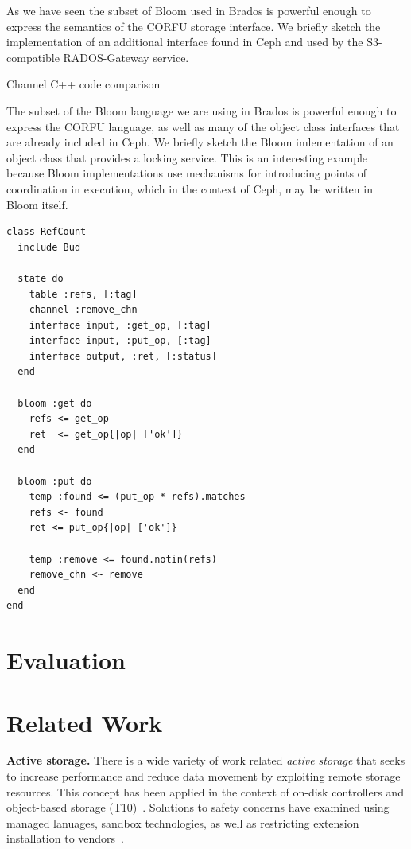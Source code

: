 \documentclass[10pt,twocolumn]{article}
\begin{document}
As we have seen the subset of Bloom used in Brados is powerful enough to
express the semantics of the CORFU storage interface. We briefly sketch the
implementation of an additional interface found in Ceph and used by the
S3-compatible RADOS-Gateway service.

Channel
C++ code comparison

The subset of the Bloom language we are using in Brados is powerful enough to
express the CORFU language, as well as many of the object class interfaces that
are already included in Ceph. We briefly sketch the Bloom imlementation of an
object class that provides a locking service. This is an interesting example
because Bloom implementations use mechanisms for introducing points of
coordination in execution, which in the context of Ceph, may be written in
Bloom itself. 

\begin{lstlisting}[caption={Hello}, label=lab]
class RefCount
  include Bud

  state do
    table :refs, [:tag]
    channel :remove_chn
    interface input, :get_op, [:tag]
    interface input, :put_op, [:tag]
    interface output, :ret, [:status]
  end

  bloom :get do
    refs <= get_op
    ret  <= get_op{|op| ['ok']}
  end

  bloom :put do
    temp :found <= (put_op * refs).matches
    refs <- found
    ret <= put_op{|op| ['ok']}

    temp :remove <= found.notin(refs)	
    remove_chn <~ remove
  end
end
\end{lstlisting}

\section{Evaluation}

\section{Related Work}

{\bf Active storage.}
There is a wide variety of work related \emph{active storage} that seeks to
increase performance and reduce data movement by exploiting remote storage
resources. This concept has been applied in the context of on-disk
controllers and object-based storage
(T10)~\cite{riedel:vldb98,du:nwesp05,xie:msst11}.  Solutions to safety
concerns have examined using managed lanuages, sandbox technologies, as well
as restricting extension installation to
vendors~\cite{john:hiperio08,xie:msst11,runde:msst12}.
\end{document}
